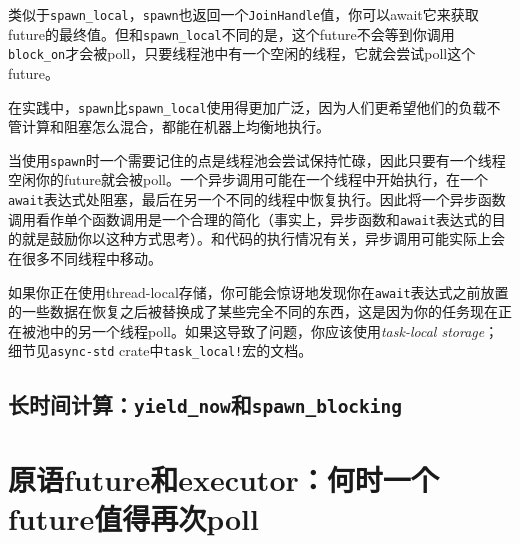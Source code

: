 类似于\texttt{spawn\_local}，\texttt{spawn}也返回一个\texttt{JoinHandle}值，你可以await它来获取future的最终值。但和\texttt{spawn\_local}不同的是，这个future不会等到你调用\texttt{block\_on}才会被poll，只要线程池中有一个空闲的线程，它就会尝试poll这个future。

在实践中，\texttt{spawn}比\texttt{spawn\_local}使用得更加广泛，因为人们更希望他们的负载不管计算和阻塞怎么混合，都能在机器上均衡地执行。

当使用\texttt{spawn}时一个需要记住的点是线程池会尝试保持忙碌，因此只要有一个线程空闲你的future就会被poll。一个异步调用可能在一个线程中开始执行，在一个\texttt{await}表达式处阻塞，最后在另一个不同的线程中恢复执行。因此将一个异步函数调用看作单个函数调用是一个合理的简化（事实上，异步函数和\texttt{await}表达式的目的就是鼓励你以这种方式思考）。和代码的执行情况有关，异步调用可能实际上会在很多不同线程中移动。

如果你正在使用thread-local存储，你可能会惊讶地发现你在\texttt{await}表达式之前放置的一些数据在恢复之后被替换成了某些完全不同的东西，这是因为你的任务现在正在被池中的另一个线程poll。如果这导致了问题，你应该使用\emph{task-local storage}；细节见\texttt{async-std} crate中\texttt{task\_local!}宏的文档。


\subsection{长时间计算：\texttt{yield\_now}和\texttt{spawn\_blocking}}\label{LongCompute}

\section{原语future和executor：何时一个future值得再次poll}\label{WhenPoll}
